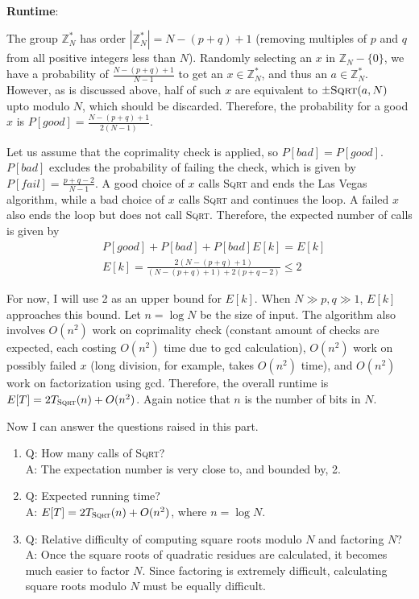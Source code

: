 \documentclass{article}
\begin{document}
~

\noindent\textbf{Runtime}:

The group $\mathbb{Z}_N^*$ has order $|\mathbb{Z}_N^*|=N-(p+q)+1$ (removing multiples of $p$ and $q$ from all positive integers less than $N$). Randomly selecting an $x$ in $\mathbb{Z}_N-\{0\}$, we have a probability of $\frac{N-(p+q)+1}{N-1}$ to get an $x\in\mathbb{Z}_N^*$, and thus an $a\in\mathbb{Z}_N^*$. However, as is discussed above, half of such $x$ are equivalent to $\pm\textsc{Sqrt}(a,N)$ upto modulo $N$, which should be discarded. Therefore, the probability for a good $x$ is $P[good]=\frac{N-(p+q)+1}{2(N-1)}$.

Let us assume that the coprimality check is applied, so $P[bad]=P[good]$. $P[bad]$ excludes the probability of failing the check, which is given by $P[fail]=\frac{p+q-2}{N-1}$. A good choice of $x$ calls \textsc{Sqrt} and ends the Las Vegas algorithm, while a bad choice of $x$ calls \textsc{Sqrt} and continues the loop. A failed $x$ also ends the loop but does not call \textsc{Sqrt}. Therefore, the expected number of calls is given by
\begin{align*}
&P[good]+P[bad]+P[bad]E[k]=E[k]\\
&E[k]=\frac{2(N-(p+q)+1)}{(N-(p+q)+1)+2(p+q-2)}\leqslant2
\end{align*}

For now, I will use 2 as an upper bound for $E[k]$. When $N\gg p,q\gg1$, $E[k]$ approaches this bound. Let $n=\log N$ be the size of input. The algorithm also involves $O(n^2)$ work on coprimality check (constant amount of checks are expected, each costing $O(n^2)$ time due to gcd calculation), $O(n^2)$ work on possibly failed $x$ (long division, for example, takes $O(n^2)$ time), and $O(n^2)$ work on factorization using gcd. Therefore, the overall runtime is $E[T]=2T_{\textsc{Sqrt}}(n)+O(n^2)$. Again notice that $n$ is the number of bits in $N$.

Now I can answer the questions raised in this part.
\begin{enumerate}
\item{Q: How many calls of \textsc{Sqrt}?\\A: The expectation number is very close to, and bounded by, 2.}
\item{Q: Expected running time?\\A: $E[T]=2T_{\textsc{Sqrt}}(n)+O(n^2)$, where $n=\log N$.}
\item{Q: Relative difficulty of computing square roots modulo $N$ and factoring $N$?\\A: Once the square roots of quadratic residues are calculated, it becomes much easier to factor $N$. Since factoring is extremely difficult, calculating square roots modulo $N$ must be equally difficult.}
\end{enumerate}
\end{document}
